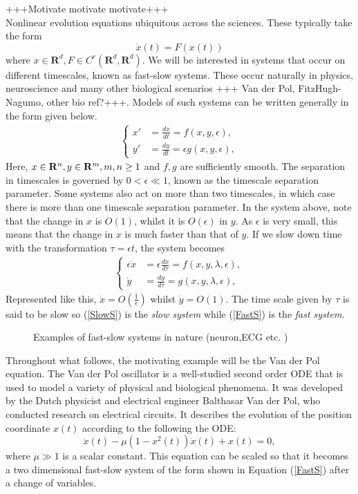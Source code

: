 +++Motivate motivate motivate+++\\
Nonlinear evolution equations ubiquitous across the sciences. These typically take the form
$$ \dot{x}(t) = F\left(x(t)\right)$$ where $x\in \mathbf{R}^d, F\in C^r(\mathbf{R}^d,\mathbf{R}^d)$. We will be interested in systems that occur on different timescales, known as fast-slow systems. These occur naturally in physics, neuroscience and many other biological scenarios +++ Van der Pol, FitzHugh-Nagumo, other bio ref?+++. Models of such systems can be written generally in the form given below.
\begin{align}
\begin{cases}
x' &=\frac{dx}{dt}= f(x,y,\epsilon),\\
y' &= \frac{dy}{dt}= \epsilon g(x,y,  \epsilon),
\end{cases}\label{FastS}
\end{align} 
Here, $x \in \mathbf{R}^n, y \in \mathbf{R}^m, m,n \geq 1$ and $f,g$ are sufficiently smooth. The separation in timescales is governed by $0<\epsilon \ll 1$, known as the timescale separation parameter. Some systems also act on more than two timescales, in which case there is more than one timescale separation parameter.  In the system above, note that the change in $x$ is $O(1)$, whilst it is $O(\epsilon)$ in $y$. As $\epsilon$ is very small, this means that the change in $x$ is much faster than that of $y$. If we slow down time with the transformation $\tau = \epsilon t$, the system becomes  
\begin{align}
	\begin{cases}
	\epsilon \dot{x} &= \epsilon \frac{dx}{d\tau} = f(x,y,\lambda, \epsilon),\\
	\dot{y} & = \frac{dy}{d \tau} =  g( x,y, \lambda, \epsilon),
	\end{cases}\label{SlowS}
\end{align} 
Represented like this, $\dot{x} = O(\frac{1}{\epsilon})$ whilst $\dot{y} = O(1)$.  The time scale given by $\tau$ is said to be slow so (\ref{SlowS}) is the \emph{slow system} while (\ref{FastS}) is the \emph{fast system}.\\


\begin{figure}[h]
	\caption{Examples of fast-slow systems in nature (neuron,ECG etc. )}
	\label{fig:nature}
\end{figure} 


Throughout what follows, the motivating example will be the Van der Pol equation. The Van der Pol oscillator is a well-studied second order ODE that is used to model a variety of physical and biological phenomena. It was developed by the Dutch physicist and electrical engineer Balthasar Van der Pol, who conducted research on electrical circuits. It describes the evolution of the position coordinate \(x(t)\) according to the following the ODE:
\begin{equation} \label{eq:vdP}
\ddot{x}(t)-\mu\left(1-x^2(t)\right)\dot{x}(t)+x(t)=0,
\end{equation}
where \(\mu \gg 1\) is a scalar constant. This equation can be scaled so that it becomes a two dimensional fast-slow system of the form shown in Equation (\ref{FastS}) after a change of variables.

